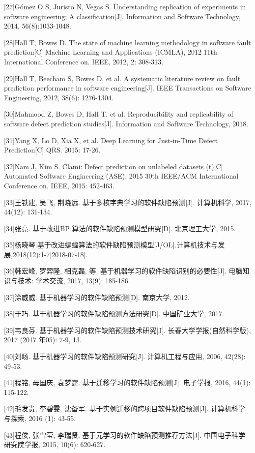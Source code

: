 \documentclass[12pt, a4paper]{article}
\begin{document}
[27]Gómez O S, Juristo N, Vegas S. Understanding replication of experiments in software  engineering:  A  classification[J].  Information  and  Software Technology, 2014, 56(8):1033-1048.

[28]Hall T, Bowes D. The state of machine learning methodology in software fault prediction[C] Machine  Learning and Applications (ICMLA),  2012 11th International Conference on. IEEE, 2012, 2: 308-313.

[29]Hall T, Beecham S, Bowes D, et al. A systematic literature review on fault prediction performance in software engineering[J]. IEEE Transactions on Software Engineering, 2012, 38(6): 1276-1304.

[30]Mahmood Z, Bowes D, Hall T, et al. Reproducibility and replicability of software defect prediction studies[J]. Information and Software Technology, 2018.

[31]Yang  X,  Lo  D,  Xia  X,  et  al.  Deep  Learning  for  Just-in-Time  Defect Prediction[C] QRS. 2015: 17-26.

[32]Nam  J,  Kim  S.  Clami:  Defect  prediction  on  unlabeled  datasets (t)[C] Automated  Software  Engineering  (ASE),  2015  30th  IEEE/ACM International Conference on. IEEE, 2015: 452-463.

[33]王铁建, 吴飞, 荆晓远. 基于多核字典学习的软件缺陷预测[J]. 计算机科学, 2017, 44(12): 131-134.

[34]张亮. 基于改进BP 算法的软件缺陷预测模型研究[D]. 北京理工大学, 2015.

[35]杨晓琴.基于改进蝙蝠算法的软件缺陷预测模型[J/OL].计算机技术与发展,2018(12):1-7[2018-07-18].

[36]韩宏峰, 罗羿隆, 相克磊, 等. 基于机器学习的软件缺陷识别的必要性[J]. 电脑知识与技术: 学术交流, 2017, 13(9): 185-186.

[37]涂威威. 基于机器学习的软件缺陷预测[D]. 南京大学, 2012.

[38]于巧. 基于机器学习的软件缺陷预测方法研究[D]. 中国矿业大学, 2017.

[39]韦良芬. 基于机器学习的软件缺陷预测技术研究[J]. 长春大学学报(自然科学版), 2017 (2017 年05): 7-9, 13.

[40]刘旸. 基于机器学习的软件缺陷预测研究[J]. 计算机工程与应用, 2006, 42(28): 49-53.

[41]程铭, 毋国庆, 袁梦霆. 基于迁移学习的软件缺陷预测[J]. 电子学报, 2016, 44(1): 115-122.

[42]毛发贵, 李碧雯, 沈备军. 基于实例迁移的跨项目软件缺陷预测[J]. 计算机科学与探索, 2016 (1): 43-55.

[43]程俊, 张雪莹, 李瑞贤. 基于元学习的软件缺陷预测推荐方法[J]. 中国电子科学研究院学报, 2015, 10(6): 620-627.
\end{document}
